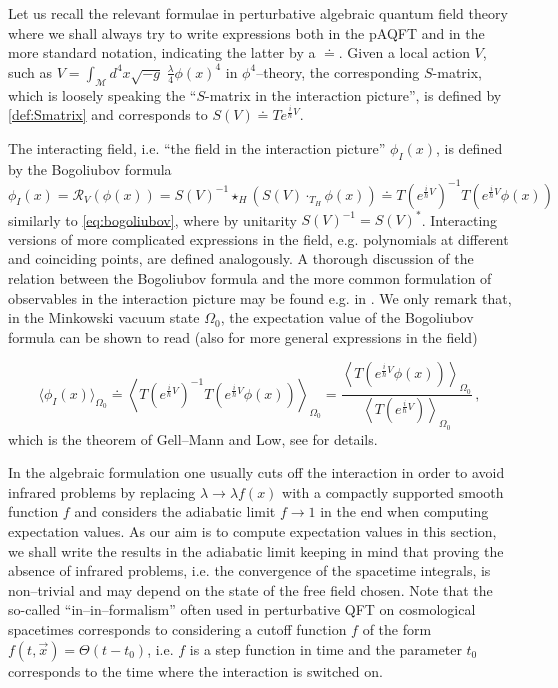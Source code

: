 \documentclass[10pt]{book}
\let\int\int
\newcommand{\Mcal}{\mathcal{M}}
\theoremstyle{break}
\begin{document}
Let us recall the relevant formulae in perturbative algebraic quantum field theory where we shall always try to write expressions both in the pAQFT and in the more standard notation, indicating the latter by a $\doteq$. Given a local action $V$, such as $V=\int_\Mcal d^4x \sqrt{-g} \; \frac{\lambda}{4} \phi(x)^4$ in $\phi^4$--theory, the corresponding $S$-matrix, which is loosely speaking the ``$S$-matrix in the interaction picture'', is defined by \eqref{def:Smatrix} and corresponds to $S(V)\doteq T e^{\frac{i}{\hbar} V}$.

The interacting field, i.e. ``the field in the interaction picture'' $\phi_I(x)$, is defined by the Bogoliubov formula
\begin{equation}\label{eq_bogoliubov}
\phi_I(x)=\mathcal{R}_V(\phi(x))=S(V)^{-1}\star_H\left(S(V)\cdot_{T_H} \phi(x)\right)\doteq T(e^{\frac{i}{\hbar} V})^{-1} T(e^{\frac{i}{\hbar} V}\phi(x))\,
\end{equation}
similarly to \eqref{eq:bogoliubov}, where by unitarity $S(V)^{-1}=S(V)^*$. Interacting versions of more complicated expressions in the field, e.g. polynomials at different and coinciding points, are defined analogously. A thorough discussion of the relation between the Bogoliubov formula and the more common formulation of observables in the interaction picture may be found e.g. in \cite[Section 3.1]{Lindner:2013ila}. We only remark that, in the Minkowski vacuum state $\Omega_0$, the expectation value of the Bogoliubov formula can be shown to read (also for more general expressions in the field)

$$\langle \phi_I(x)\rangle_{\Omega_0} \doteq \left\langle T(e^{\frac{i}{\hbar} V})^{-1}T(e^{\frac{i}{\hbar} V}\phi(x))\right\rangle_{\Omega_0}=\frac{\left\langle T(e^{\frac{i}{\hbar} V}\phi(x))\right\rangle_{\Omega_0}}{\left\langle T(e^{\frac{i}{\hbar} V}) \right\rangle_{\Omega_0}}\,,$$
which is the theorem of Gell--Mann and Low, see \cite{Duetsch:1996eh, Duetsch:2000nh} for details.

In the algebraic formulation one usually cuts off the interaction in order to avoid infrared problems by replacing $\lambda\to \lambda f(x)$ with a compactly supported smooth function $f$ and considers the adiabatic limit $f\to 1$ in the end when computing expectation values. As our aim is to compute expectation values in this section, we shall write the results in the adiabatic limit keeping in mind that proving the absence of infrared problems, i.e. the convergence of the spacetime integrals, is non--trivial and may depend on the state of the free field chosen. Note that the so-called ``in--in--formalism'' often used in perturbative QFT on cosmological spacetimes corresponds to considering a cutoff function $f$ of the form $f(t,\vec{x}) = \Theta(t-t_0)$, i.e. $f$ is a step function in time and the parameter $t_0$ corresponds to the time where the interaction is switched on.
\end{document}
